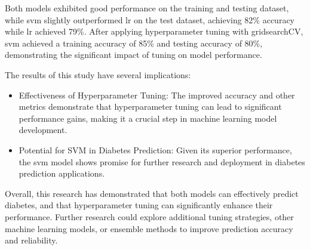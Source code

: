 Both models exhibited good performance on the training and testing dataset, while svm slightly outperformed lr on the test dataset, achieving 82\% accuracy while lr achieved 79\%. After applying hyperparameter tuning with gridsearchCV, svm achieved a training accuracy of 85\% and testing accuracy of 80\%, demonstrating the significant impact of tuning on model performance.

The results of this study have several implications:
\begin{itemize}
    \item Effectiveness of Hyperparameter Tuning: The improved accuracy and other metrics demonstrate that hyperparameter tuning can lead to significant performance gains, making it a crucial step in machine learning model development.
    \item Potential for SVM in Diabetes Prediction: Given its superior performance, the svm model shows promise for further research and deployment in diabetes prediction applications.
\end{itemize}

Overall, this research has demonstrated that both models can effectively predict diabetes, and that hyperparameter tuning can significantly enhance their performance. Further research could explore additional tuning strategies, other machine learning models, or ensemble methods to improve prediction accuracy and reliability.

